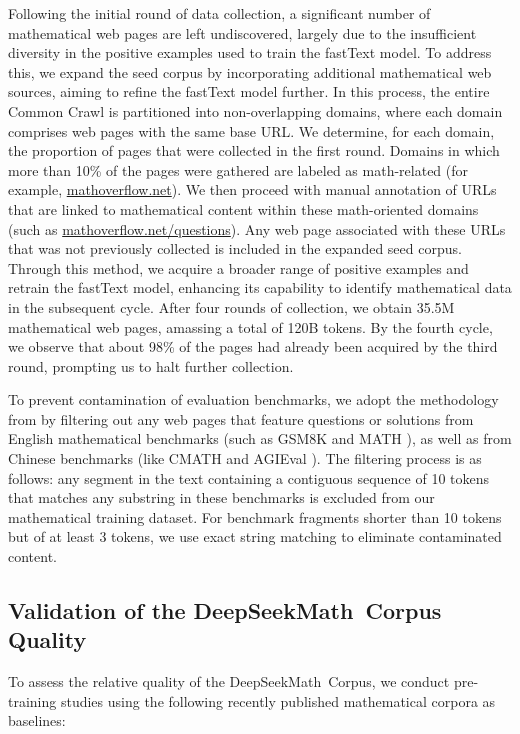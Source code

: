 Following the initial round of data collection, a significant number of mathematical web pages are left undiscovered, largely due to the insufficient diversity in the positive examples used to train the fastText model. To address this, we expand the seed corpus by incorporating additional mathematical web sources, aiming to refine the fastText model further. In this process, the entire Common Crawl is partitioned into non-overlapping domains, where each domain comprises web pages with the same base URL. We determine, for each domain, the proportion of pages that were collected in the first round. Domains in which more than 10\% of the pages were gathered are labeled as math-related (for example, \url{mathoverflow.net}).
We then proceed with manual annotation of URLs that are linked to mathematical content within these math-oriented domains (such as \url{mathoverflow.net/questions}). Any web page associated with these URLs that was not previously collected is included in the expanded seed corpus. Through this method, we acquire a broader range of positive examples and retrain the fastText model, enhancing its capability to identify mathematical data in the subsequent cycle. After four rounds of collection, we obtain 35.5M mathematical web pages, amassing a total of 120B tokens. By the fourth cycle, we observe that about 98\% of the pages had already been acquired by the third round, prompting us to halt further collection.

To prevent contamination of evaluation benchmarks, we adopt the methodology from \cite{deepseek-coder} by filtering out any web pages that feature questions or solutions from English mathematical benchmarks (such as GSM8K \citep{gsm8k} and MATH \citep{MATH}), as well as from Chinese benchmarks (like CMATH \citep{wei2023cmath} and AGIEval \citep{agieval}). The filtering process is as follows: any segment in the text containing a contiguous sequence of 10 tokens that matches any substring in these benchmarks is excluded from our mathematical training dataset. For benchmark fragments shorter than 10 tokens but of at least 3 tokens, we use exact string matching to eliminate contaminated content.

\subsection{Validation of the DeepSeekMath~Corpus Quality}

To assess the relative quality of the DeepSeekMath~Corpus, we conduct pre-training studies using the following recently published mathematical corpora as baselines:

